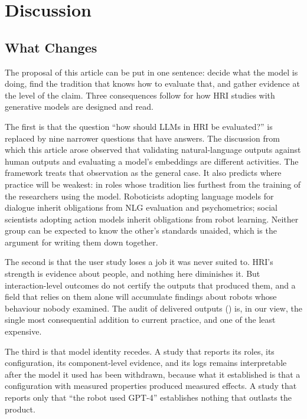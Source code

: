 \section{Discussion}
\label{sec:discussion}

\subsection{What Changes}

The proposal of this article can be put in one sentence: decide what the
model is doing, find the tradition that knows how to evaluate that, and
gather evidence at the level of the claim. Three consequences follow for how
HRI studies with generative models are designed and read.

The first is that the question ``how should LLMs in HRI be evaluated?'' is
replaced by nine narrower questions that have answers. The discussion from
which this article arose observed that validating natural-language outputs
against human outputs and evaluating a model's embeddings are different
activities. The framework treats that observation as the general case. It
also predicts where practice will be weakest: in roles whose tradition lies
furthest from the training of the researchers using the model. Roboticists
adopting language models for dialogue inherit obligations from NLG evaluation
and psychometrics; social scientists adopting action models inherit
obligations from robot learning. Neither group can be expected to know the
other's standards unaided, which is the argument for writing them down
together.

The second is that the user study loses a job it was never suited to. HRI's
strength is evidence about people, and nothing here diminishes it. But
interaction-level outcomes do not certify the outputs that produced them, and
a field that relies on them alone will accumulate findings about robots
whose behaviour nobody examined. The audit of delivered outputs
() is, in our view, the single most consequential addition to
current practice, and one of the least expensive.

The third is that model identity recedes. A study that reports its roles,
its configuration, its component-level evidence, and its logs remains
interpretable after the model it used has been withdrawn, because what it
established is that a configuration with measured properties produced
measured effects. A study that reports only that ``the robot used GPT-4''
establishes nothing that outlasts the product.

